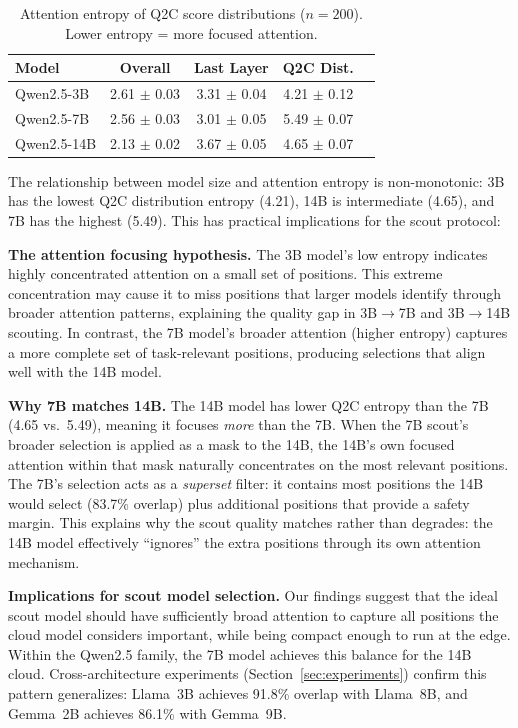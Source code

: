 \documentclass[journal]{IEEEtran}
\newcommand{\QtoC}{\textsc{Q2C}\xspace}
\begin{document}
\begin{table}[t]
\centering
\caption{Attention entropy of Q2C score distributions ($n = 200$). Lower entropy = more focused attention.}
\label{tab:entropy}
\small
\begin{tabular}{@{}lcccc@{}}
\toprule
\textbf{Model} & \textbf{Overall} & \textbf{Last Layer} & \textbf{Q2C Dist.} \\
\midrule
Qwen2.5-3B  & 2.61 $\pm$ 0.03 & 3.31 $\pm$ 0.04 & 4.21 $\pm$ 0.12 \\
Qwen2.5-7B  & 2.56 $\pm$ 0.03 & 3.01 $\pm$ 0.05 & 5.49 $\pm$ 0.07 \\
Qwen2.5-14B & 2.13 $\pm$ 0.02 & 3.67 $\pm$ 0.05 & 4.65 $\pm$ 0.07 \\
\bottomrule
\end{tabular}
\end{table}

The relationship between model size and attention entropy is non-monotonic: 3B has the lowest \QtoC distribution entropy (4.21), 14B is intermediate (4.65), and 7B has the highest (5.49).
This has practical implications for the scout protocol:

\textbf{The attention focusing hypothesis.}
The 3B model's low entropy indicates highly concentrated attention on a small set of positions.
This extreme concentration may cause it to miss positions that larger models identify through broader attention patterns, explaining the quality gap in 3B$\to$7B and 3B$\to$14B scouting.
In contrast, the 7B model's broader attention (higher entropy) captures a more complete set of task-relevant positions, producing selections that align well with the 14B model.

\textbf{Why 7B matches 14B.}
The 14B model has lower \QtoC entropy than the 7B (4.65 vs.\ 5.49), meaning it focuses \emph{more} than the 7B.
When the 7B scout's broader selection is applied as a mask to the 14B, the 14B's own focused attention within that mask naturally concentrates on the most relevant positions.
The 7B's selection acts as a \emph{superset} filter: it contains most positions the 14B would select (83.7\% overlap) plus additional positions that provide a safety margin.
This explains why the scout quality matches rather than degrades: the 14B model effectively ``ignores'' the extra positions through its own attention mechanism.

\textbf{Implications for scout model selection.}
Our findings suggest that the ideal scout model should have sufficiently broad attention to capture all positions the cloud model considers important, while being compact enough to run at the edge.
Within the Qwen2.5 family, the 7B model achieves this balance for the 14B cloud.
Cross-architecture experiments (Section~\ref{sec:experiments}) confirm this pattern generalizes: Llama~3B achieves 91.8\% overlap with Llama~8B, and Gemma~2B achieves 86.1\% with Gemma~9B.
\end{document}
